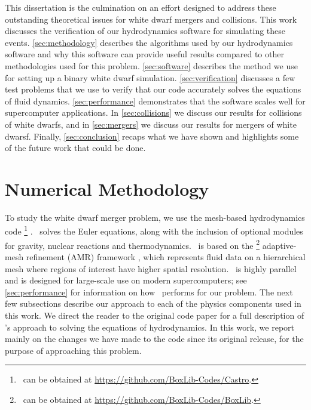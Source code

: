 \documentclass[12pt]{article}
\begin{document}
This dissertation is the culmination on an effort designed to address these
outstanding theoretical issues for white dwarf mergers and collisions. This work 
discusses the verification of our hydrodynamics software for simulating
these events. \autoref{sec:methodology} describes the algorithms used by our
hydrodynamics software and why this software can provide useful results compared to
other methodologies used for this problem. 
\autoref{sec:software} describes the method we use for setting up a
binary white dwarf simulation. \autoref{sec:verification} discusses a few
test problems that we use to verify that our code accurately
solves the equations of fluid dynamics. \autoref{sec:performance}
demonstrates that the software scales well for supercomputer
applications. In \autoref{sec:collisions} we discuss our results for
collisions of white dwarfs, and in \autoref{sec:mergers} we discuss
our results for mergers of white dwarsf. Finally, \autoref{sec:conclusion}
recaps what we have shown and highlights some of the future work that
could be done.



\newpage
\section{Numerical Methodology}
\label{sec:methodology}

To study the white dwarf merger problem, we use the mesh-based
hydrodynamics code \castro\footnote{\castro\ can be obtained at \url{https://github.com/BoxLib-Codes/Castro}.} \citep{castro}.
\castro\ solves the Euler
equations, along with the inclusion of optional modules for gravity,
nuclear reactions and thermodynamics. \castro\ is based on the \boxlib
\footnote{\boxlib\ can be obtained at \url{https://github.com/BoxLib-Codes/BoxLib}.}
adaptive-mesh refinement (AMR) framework \citep{rendleman:2000}, which
represents fluid data on a hierarchical mesh where regions of interest have higher
spatial resolution. \castro\ is highly parallel and is designed for
large-scale use on modern supercomputers; see 
\autoref{sec:performance} for information on how \castro\ performs for our
problem. The next few subsections describe our approach to each of the
physics components used in this work. We direct the reader to the
original code paper for a full description of \castro's approach to
solving the equations of hydrodynamics. In this work, we report mainly
on the changes we have made to the code since its original release,
for the purpose of approaching this problem.
\end{document}

